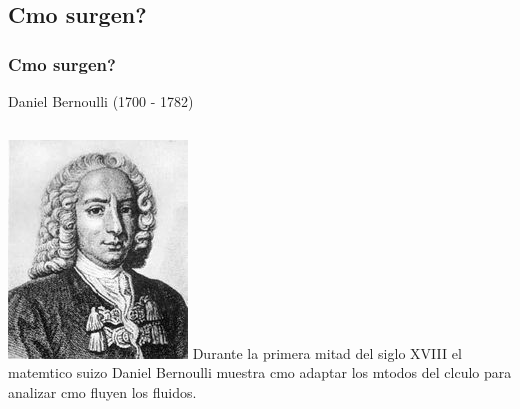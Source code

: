 \documentclass[serif,9pt]{beamer}
\begin{document}
\subsection{Cmo surgen?}
\begin{frame}
\frametitle{Cmo surgen?} 

\begin{block}{Daniel Bernoulli (1700 - 1782)}
\begin{columns}
 \hspace{0.9cm}
\includegraphics[width=\textwidth]{Danielbernoulli} 
Durante la primera mitad del siglo XVIII el matemtico suizo Daniel Bernoulli muestra cmo adaptar los
mtodos del clculo para analizar cmo fluyen los fluidos.
\end{columns}
\end{block}

\pause
\bigskip


\end{frame}
\end{document}
